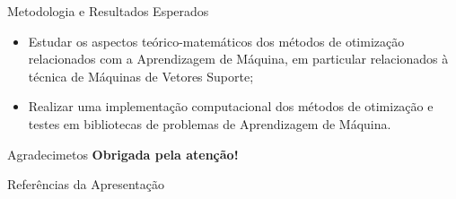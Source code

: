 \documentclass{beamer}
\theoremstyle{definition}%
\begin{document}
\begin{frame}{Metodologia e Resultados Esperados}
\begin{itemize}
	\item Estudar os aspectos teórico-matemáticos dos métodos de otimização relacionados com a Aprendizagem de Máquina, em particular relacionados à técnica de Máquinas de Vetores Suporte;

	\item Realizar uma implementação computacional dos métodos de otimização e testes em bibliotecas de problemas de Aprendizagem de Máquina.
\end{itemize}
\end{frame}


\begin{frame}{Agradecimetos}
\centering
\Large{\textbf{Obrigada pela atenção!}}
\end{frame}


\begin{frame}{Referências da Apresentação}
\printbibliography
\end{frame}
\end{document}
